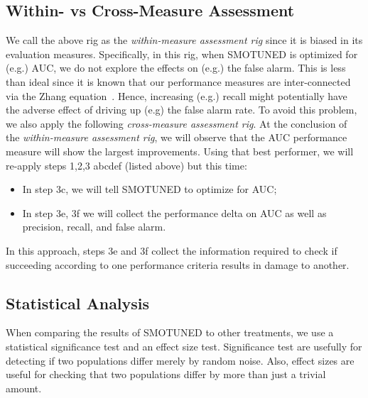 \documentclass[10pt,conference]{IEEEtran}
\newcommand{\bi}{\begin{itemize}[leftmargin=0.4cm]}
\newcommand{\ei}{\end{itemize}}
\theoremstyle{break}
\theoremstyle{break}
\newcommand{\smb}{{\sc SMOTUNED}}
\begin{document}
\subsection{Within- vs Cross-Measure Assessment}
\label{sect:wcm}
We call the above rig as the {\em within-measure assessment rig} since it is  biased in its evaluation measures. Specifically,  in this rig,
when {\smb} is optimized for (e.g.) AUC, we do not explore the effects on (e.g.) the false alarm. This is less than ideal
since it is known that our performance measures are inter-connected via the Zhang equation~\cite{zhang2007comments}. Hence, increasing (e.g.) recall might potentially have the adverse
effect of  driving up (e.g) the false alarm rate. 
To avoid this problem, we also apply the following {\em cross-measure assessment rig}.
At the conclusion of the {\em within-measure assessment rig}, we will observe  that the AUC performance measure will show the largest improvements. Using that best performer, we will re-apply steps 1,2,3 abcdef (listed above) but this time:
\bi
\item In step 3c, we will tell {\smb} to optimize for AUC;
\item In step 3e, 3f we will collect the performance delta on AUC as well as precision, recall,
and false alarm.
\ei
In this approach, steps 3e and 3f collect the information required   to check if succeeding according to one performance criteria results in damage to another.


\subsection{Statistical Analysis}

When comparing the results of {\smb} to other
treatments, we use a statistical
significance test and an effect size test.
Significance test are usefully for detecting if two populations
differ merely by random noise. 
Also, effect sizes are useful for checking that two populations differ by more than just a trivial amount.
\end{document}
